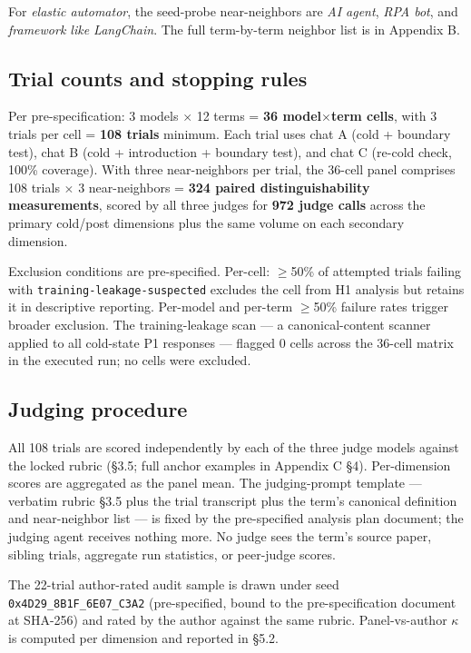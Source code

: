 \documentclass[11pt,a4paper]{article}
\begin{document}
For \textit{elastic automator}, the seed-probe near-neighbors are \textit{AI agent}, \textit{RPA bot}, and \textit{framework like LangChain}. The full term-by-term neighbor list is in Appendix B.

\subsection{Trial counts and stopping rules}

Per pre-specification: 3 models $\times$ 12 terms = \textbf{36 model$\times$term cells}, with 3 trials per cell = \textbf{108 trials} minimum. Each trial uses chat A (cold + boundary test), chat B (cold + introduction + boundary test), and chat C (re-cold check, 100\% coverage). With three near-neighbors per trial, the 36-cell panel comprises 108 trials $\times$ 3 near-neighbors = \textbf{324 paired distinguishability measurements}, scored by all three judges for \textbf{972 judge calls} across the primary cold/post dimensions plus the same volume on each secondary dimension.

Exclusion conditions are pre-specified. Per-cell: $\geq$50\% of attempted trials failing with \texttt{training-leakage-suspected} excludes the cell from H1 analysis but retains it in descriptive reporting. Per-model and per-term $\geq$50\% failure rates trigger broader exclusion. The training-leakage scan --- a canonical-content scanner applied to all cold-state P1 responses --- flagged 0 cells across the 36-cell matrix in the executed run; no cells were excluded.

\subsection{Judging procedure}

All 108 trials are scored independently by each of the three judge models against the locked rubric (\S3.5; full anchor examples in Appendix C \S4). Per-dimension scores are aggregated as the panel mean. The judging-prompt template --- verbatim rubric \S3.5 plus the trial transcript plus the term's canonical definition and near-neighbor list --- is fixed by the pre-specified analysis plan document; the judging agent receives nothing more. No judge sees the term's source paper, sibling trials, aggregate run statistics, or peer-judge scores.

The 22-trial author-rated audit sample is drawn under seed \texttt{0x4D29\_8B1F\_6E07\_C3A2} (pre-specified, bound to the pre-specification document at SHA-256) and rated by the author against the same rubric. Panel-vs-author $\kappa$ is computed per dimension and reported in \S5.2.
\end{document}
